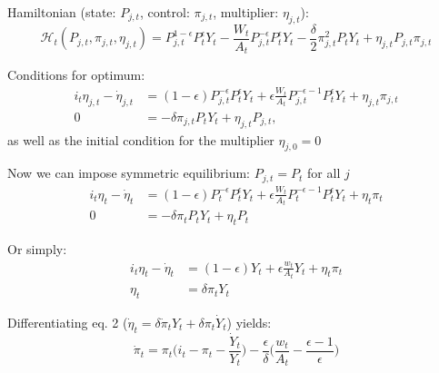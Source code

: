 \documentclass[11pt, aspectratio=169]{beamer}
\newenvironment{witemize}{\itemize\addtolength{\itemsep}{10pt}}{\enditemize}
\begin{document}
\begin{frame}{}
\begin{witemize}
\item Hamiltonian (state: $P_{j, t}$, control: $\pi_{j, t}$, multiplier: $\eta_{j, t}$):
\begin{equation*}
	\mathcal H_t(P_{j, t}, \pi_{j, t}, \eta_{j, t}) = P_{j, t}^{1-\epsilon} P_t^{\epsilon} Y_t - \frac{W_t}{A_t} P_{j, t}^{-\epsilon} P_t^{\epsilon} Y_t  - \frac{\delta}{2} \pi_{j, t}^2 P_t Y_t + \eta_{j, t} P_{j, t} \pi_{j, t}
\end{equation*}

\item Conditions for optimum:
\begin{align*}
	i_t \eta_{j, t} - \dot \eta_{j, t} &= (1-\epsilon) P_{j, t}^{-\epsilon} P_t^{\epsilon} Y_t + \epsilon \frac{W_t}{A_t} P_{j, t}^{-\epsilon - 1} P_t^{\epsilon} Y_t + \eta_{j, t} \pi_{j, t}  \\
	0 &= - \delta \pi_{j, t} P_t Y_t + \eta_{j, t} P_{j, t},
\end{align*}
as well as the initial condition for the multiplier $\eta_{j, 0} = 0$

\end{witemize}
\end{frame}


\begin{frame}{}
\begin{witemize}

\item Now we can impose symmetric equilibrium: $P_{j, t} = P_t$ for all $j$
\begin{align*}
	i_t \eta_t - \dot \eta_t  &= (1-\epsilon) P_t^{-\epsilon} P_t^{\epsilon} Y_t + \epsilon \frac{W_t}{A_t} P_t^{-\epsilon - 1} P_t^{\epsilon} Y_t + \eta_t \pi_t  \\
	0 &= - \delta \pi_t P_t Y_t + \eta_t P_t
\end{align*}

\item Or simply:
\begin{align*}
	i_t \eta_t - \dot \eta_t  &= (1-\epsilon) Y_t + \epsilon \frac{w_t}{A_t} Y_t + \eta_t \pi_t  \\
	\eta_t &= \delta \pi_t Y_t
\end{align*}

\item Differentiating eq. 2 ($\dot \eta_t = \delta \dot \pi_t Y_t + \delta \pi_t \dot Y_t$) yields:
\begin{equation*}
	 \dot \pi_t = \pi_t \bigg( i_t -  \pi_t - \frac{\dot Y_t}{Y_t} \bigg) - \frac{\epsilon}{\delta} \bigg( \frac{w_t}{A_t} - \frac{\epsilon - 1}{\epsilon} \bigg)
\end{equation*}
\end{witemize}
\end{frame}
\end{document}
